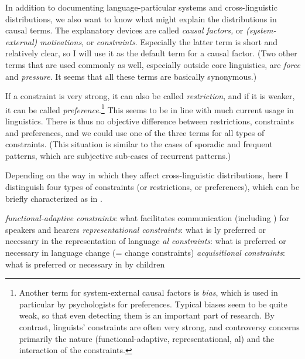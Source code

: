 \documentclass[output=paper]{langsci/langscibook}
\begin{document}
In addition to documenting language-particular systems and cross-linguistic distributions, we also want to know what might explain the distributions in causal terms. The explanatory devices are called \textit{causal factors,} or \textit{(system-external) motivations}, or \textit{constraints}. Especially the latter term is short and relatively clear, so I will use it as the default term for a causal factor. (Two other terms that are used commonly as well, especially outside core linguistics, are \textit{force} and \textit{pressure}. It seems that all these terms are basically synonymous.)

If a constraint is very strong, it can also be called \textit{restriction}, and if it is weaker, it can be called \textit{preference.}\footnote{Another term for system-external causal factors is \textit{bias}, which is used in particular by psychologists for  preferences. Typical biases seem to be quite weak, so that even detecting them is an important part of research. By contrast, linguists’ constraints are often very strong, and controversy concerns primarily the nature (functional-adaptive, representational, al) and the interaction of the constraints.} This seems to be in line with much current usage in linguistics. There is thus no objective difference between restrictions, constraints and preferences, and we could use one of the three terms for all types of constraints. (This situation is similar to the cases of sporadic and frequent patterns, which are subjective sub-cases of recurrent patterns.)

Depending on the way in which they affect cross-linguistic distributions, here I distinguish four types of constraints (or restrictions, or preferences), which can be briefly characterized as in .

\eanoraggedright\label{ex:haspelmath:2} 
  \ea \textit{functional-adaptive constraints}: what facilitates communication (including ) for speakers and hearers
  \ex \textit{representational constraints}: what is ly preferred or necessary in the  representation of language
  \ex \textit{al constraints}: what is preferred or necessary in language change (= change constraints)
  \ex \textit{acquisitional constraints}:  what is preferred or necessary in  by children
  \z
\z
\end{document}
